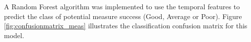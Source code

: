 A Random Forest algorithm was implemented to use the temporal features to predict the class of potential measure success (Good, Average or Poor). Figure \ref{fig:confusionmatrix_meas} illustrates the classification confusion matrix for this model. 